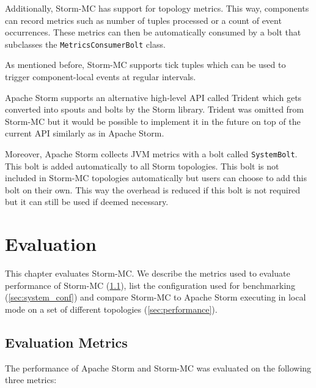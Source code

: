\documentclass[bsc,twoside,singlespacing,normalheadings,parskip]{infthesis}\usepackage[]{graphicx}\usepackage[]{color}
\let\Oldtodo\todo
\renewcommand{\todo}[1]{\Oldtodo[inline]{#1}}
\begin{document}
Additionally, Storm-MC has support for topology metrics. This way, components can record metrics such as number of tuples processed or a count of event occurrences. These metrics can then be automatically consumed by a bolt that subclasses the \texttt{MetricsConsumerBolt} class.

As mentioned before, Storm-MC supports tick tuples which can be used  to trigger component-local events at regular intervals.




Apache Storm supports an alternative high-level API called Trident which gets converted into spouts and bolts by the Storm library. Trident was omitted from Storm-MC but it would be possible to implement it in the future on top of the current API similarly as in Apache Storm.

Moreover, Apache Storm collects JVM metrics with a bolt called \texttt{SystemBolt}. This bolt is added automatically to all Storm topologies. This bolt is not included in Storm-MC topologies automatically but users can choose to add this bolt on their own. This way the overhead is reduced if this bolt is not required but it can still be used if deemed necessary.


\todo{Mention profiling.}

\clearpage{}

\clearpage{}\clearpage{}

\clearpage{}\chapter{Evaluation}

This chapter evaluates Storm-MC. We describe the metrics used to evaluate performance of Storm-MC (\ref{sec:metrics}), list the configuration used for benchmarking (\ref{sec:system_conf}) and compare Storm-MC to Apache Storm executing in local mode on a set of different topologies (\ref{sec:performance}).

\section{Evaluation Metrics}
\label{sec:metrics}

The performance of Apache Storm and Storm-MC was evaluated on the following three metrics:
\end{document}

